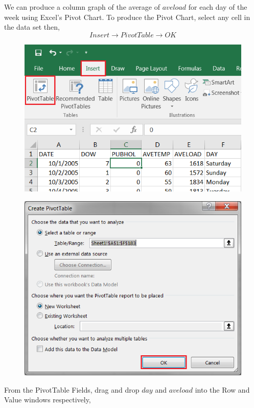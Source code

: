 \documentclass[12pt]{report}
\begin{document}
\noindent We can produce a column graph of the average of $aveload$ for each day of the week using Excel’s Pivot Chart. To produce the Pivot Chart, select any cell in the data set then,
$$Insert \to PivotTable \to OK$$
\begin{figure}[H]
	\centerline{\includegraphics{q1_5}}
\end{figure}
\vspace{-\baselineskip}
\begin{figure}[H]
	\centerline{\includegraphics{q1_6}}
\end{figure}
\vspace{-\baselineskip}
\noindent From the PivotTable Fields, drag and drop $day$ and $aveload$ into the Row and Value windows respectively,
\end{document}
